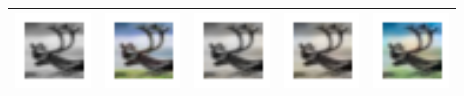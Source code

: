 \documentclass{article}
\begin{document}
\begin{table}[h!]
\begin{tabular}{ccccc}
    \includegraphics[width=2cm]{results3/40-bw.png} & \includegraphics[width=2cm]{results3/40-gt.png} & \includegraphics[width=2cm]{results5/40-relucnn.png} & \includegraphics[width=2cm]{results5/40-tanhcnn.png} & \includegraphics[width=2cm]{results3/40-gan.png} \\
    \bottomrule
  \end{tabular}
\end{table}
\end{document}
